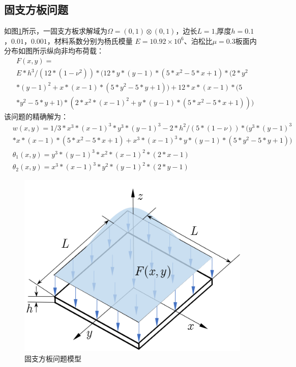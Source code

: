 \subsection{固支方板问题}
如图\ref{plate}所示，一固支方板求解域为$\Omega=(0,1)\otimes(0,1)$，边长$L=1$,厚度$h=0.1$，$0.01$，$0.001$，材料系数分别为杨氏模量
$E=10.92\times10^6$、泊松比$\mu=0.3$板面内分布如图所示纵向非均布荷载：
\begin{equation} 
\begin{split} 
    &F(x,y) =\\
    &E*h^3/(12*(1-ν^2))*(12*y*(y-1)*(5*x^2-5*x+1)*(2*y^2\\
    &*(y-1)^2+x*(x-1)*(5*y^2-5*y+1))+12*x*(x-1)*(5\\
    &*y^2-5*y+1)*(2*x^2*(x-1)^2+y*(y-1)*(5*x^2-5*x+1)))
\end{split} 
\end{equation}
该问题的精确解为：
\begin{equation} 
    \begin{split} 
        &w(x,y) = 1/3*x^3*(x-1)^3*y^3*(y-1)^3-2*h^2/(5*(1-ν))*(y^3*(y-1)^3\\
        &*x*(x-1)*(5*x^2-5*x+1)+x^3*(x-1)^3*y*(y-1)*(5*y^2-5*y+1))\\
        &\theta_1(x,y) = y^3*(y-1)^3*x^2*(x-1)^2*(2*x-1)\\
        &\theta_2(x,y) = x^3*(x-1)^3*y^2*(y-1)^2*(2*y-1)
    \end{split} 
\end{equation}
\begin{figure}[H]
    \centering 
        \includegraphics[scale=0.8]{figures/shearlocking/plate.png}
        \caption{固支方板问题模型}\label{plate}
\end{figure}
 
